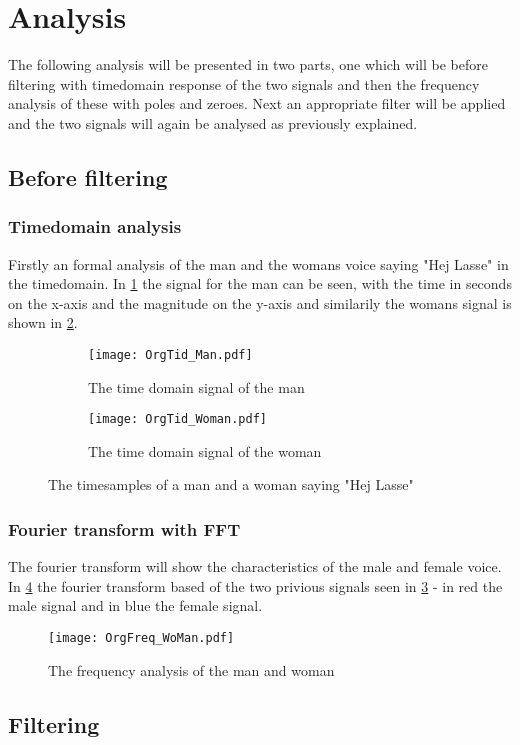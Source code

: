 
\section{Analysis}

The following analysis will be presented in two parts, one which will be before filtering with timedomain response of the two signals and then the frequency analysis of these with poles and zeroes. Next an appropriate filter will be applied and the two signals will again be analysed as previously explained.

\subsection{Before filtering}

\subsubsection{Timedomain analysis}

Firstly an formal analysis of the man and the womans voice saying "Hej Lasse" in the timedomain. In \cref{fig:time_man} the signal for the man can be seen, with the time in seconds on the x-axis and the magnitude on the y-axis and similarily the womans signal is shown in \cref{fig:time_woman}.

\begin{figure}
\centering
\begin{subfigure}{0.45\textwidth}
	\texttt{[image: OrgTid\_Man.pdf]}
	\caption{The time domain signal of the man}
	\label{fig:time_man}
\end{subfigure}
\quad
\begin{subfigure}{0.45\textwidth}
\texttt{[image: OrgTid\_Woman.pdf]}
\caption{The time domain signal of the woman}
\label{fig:time_woman}
\end{subfigure}
\caption{The timesamples of a man and a woman saying "Hej Lasse"}
\label{fig:time_WoMan}
\end{figure}

\subsubsection{Fourier transform with FFT}

The fourier transform will show the characteristics of the male and female voice. In \cref{fig:WoManFFT} the fourier transform based of the two privious signals seen in \cref{fig:time_WoMan} - in red the male signal and in blue the female signal.

\begin{figure}
\centering
\texttt{[image: OrgFreq\_WoMan.pdf]}
\caption{The frequency analysis of the man and woman}
\label{fig:WoManFFT}
\end{figure}

\subsection{Filtering}

